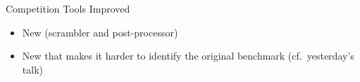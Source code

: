 \documentclass{beamer}
\begin{document}


\begin{frame}{Competition Tools Improved}
  \begin{itemize}
  \item New  (scrambler and
    post-processor)

    \bigskip

  \item New  that makes it harder to
    identify the original benchmark (cf.\ yesterday's talk)
  \end{itemize}
  \bigskip
\end{frame}

\logo{}


\begin{frame}{}
  \begin{center}
    \vfill
      {\huge {}}
    \vfill
  \end{center}
\end{frame}

{
  
  
  
  
}


\begin{frame}{}
  \begin{center}
    \vfill
      {\huge {}}
    \vfill
  \end{center}
\end{frame}

\end{document}
